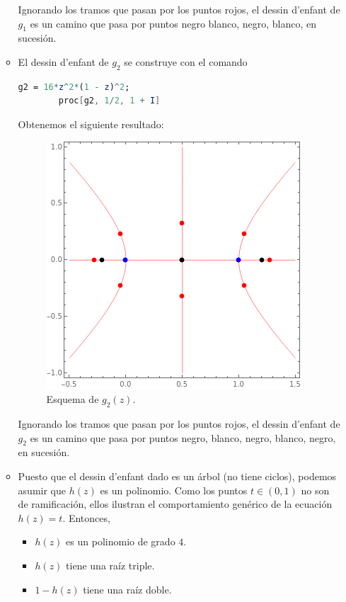 \begin{solution}
\begin{itemize}
\begin{itemize}
        Ignorando los tramos que pasan por los puntos rojos, el dessin d'enfant de $g_1$ es un camino que pasa por puntos negro blanco, negro, blanco, en sucesión.
        
        \item El dessin d'enfant de $g_2$ se construye con el comando
        \begin{lstlisting}[language=Mathematica]
        g2 = 16*z^2*(1 - z)^2;
        proc[g2, 1/2, 1 + I]
        \end{lstlisting}
        
        Obtenemos el siguiente resultado:
        \begin{figure}[h]
            \centering
            \includegraphics[scale=0.4]{dessins/g2.png}
            \caption{Esquema de $g_2(z)$.}
        \end{figure}
        
        Ignorando los tramos que pasan por los puntos rojos, el dessin d'enfant de $g_2$ es un camino que pasa por puntos negro, blanco, negro, blanco, negro, en sucesión.
        
        \item Puesto que el dessin d'enfant dado es un árbol (no tiene ciclos), podemos asumir que $h(z)$ es un polinomio. Como los puntos $t \in (0, 1)$ no son de ramificación, ellos ilustran el comportamiento genérico de la ecuación $h(z) = t$. Entonces,
        \begin{itemize}
            \item $h(z)$ es un polinomio de grado $4$.
            \item $h(z)$ tiene una raíz triple.
            \item $1 - h(z)$ tiene una raíz doble.
        \end{itemize}
        

\end{itemize}
\end{itemize}
\end{solution}
